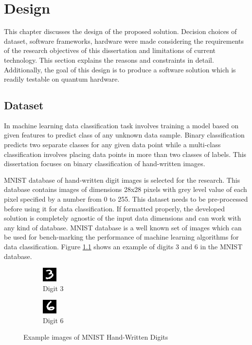 \documentclass[english,a4paper,11pt,oneside,onecolumn]{book}
\begin{document}
\chapter{Design}
\label{sec:desgn}
This chapter discusses the design of the proposed solution. Decision choices of dataset, software frameworks, hardware were made considering the requirements of the research objectives of this dissertation and limitations of current technology. This section explains the reasons and constraints in detail. Additionally, the goal of this design is to produce a software solution which is readily testable on quantum hardware.

\section{Dataset}
\label{sec:dataset}
In machine learning data classification task involves training a model based on given features to predict class of any unknown data sample. Binary classification predicts two separate classes for any given data point while a multi-class classification involves placing data points in more than two classes of labels. This dissertation focuses on binary classification of hand-written images. 

MNIST database \cite{kussul_2004_improved} of hand-written digit images is selected for the research. This database contains images of dimensions 28x28 pixels with grey level value of each pixel specified by a number from 0 to 255. This dataset needs to be pre-processed before using it for data classification. If formatted properly, the developed solution is completely agnostic of the input data dimensions and can work with any kind of database. MNIST database is a well known set of images which can be used for bench-marking the performance of machine learning algorithms for data classification. Figure \ref{fig:mnistEg} shows an example of digits 3 and 6 in the MNIST database.

\begin{figure}[H]
    \begin{subfigure}{0.5\textwidth}
    \begin{center}
    \includegraphics[width=0.1\linewidth]{Images/mnist_example_digit_3.jpg}
    \end{center}
    \caption{Digit 3}
    \end{subfigure}
    \begin{subfigure}{0.5\textwidth}
    \begin{center}
    \includegraphics[width=0.1\linewidth]{Images/mnist_example_digit_6.jpg}
    \end{center}
    \caption{Digit 6}
    \end{subfigure}
    \caption{Example images of MNIST Hand-Written Digits}
    \label{fig:mnistEg}
\end{figure}
\end{document}
